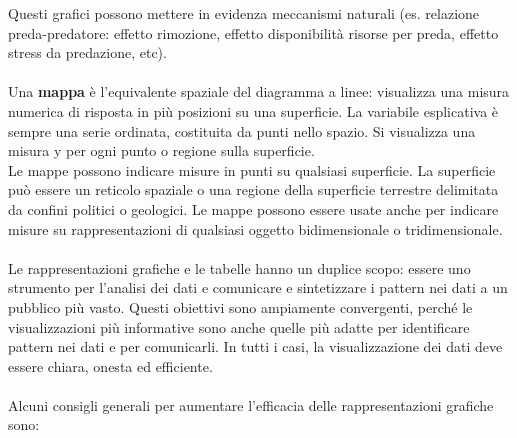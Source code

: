 \documentclass[10pt, draft]{book}
\begin{document}
Questi grafici possono mettere in evidenza meccanismi naturali (es. relazione preda-predatore: effetto rimozione, effetto disponibilità risorse per preda, effetto stress da predazione, etc).
\\
\\
Una \textbf{mappa} è l'equivalente spaziale del diagramma a linee: visualizza una misura numerica di risposta in più posizioni su una superficie. La variabile esplicativa è sempre una serie ordinata, costituita da punti nello spazio. Si visualizza una misura y per ogni punto o regione sulla superficie.
\\
Le mappe possono indicare misure in punti su qualsiasi superficie. La superficie può essere un reticolo spaziale o una regione della superficie terrestre delimitata da confini politici o geologici. Le mappe possono essere usate anche per indicare misure su rappresentazioni di qualsiasi oggetto bidimensionale o tridimensionale.
\\
\\
Le rappresentazioni grafiche e le tabelle hanno un duplice scopo: essere uno strumento per l'analisi dei dati e comunicare e sintetizzare i pattern nei dati a un pubblico più vasto. Questi obiettivi sono ampiamente convergenti, perché le visualizzazioni più informative sono anche quelle più adatte per identificare pattern nei dati e per comunicarli. In tutti i casi, la visualizzazione dei dati deve essere chiara, onesta ed efficiente.
\\
\\
Alcuni consigli generali per aumentare l'efficacia delle rappresentazioni grafiche sono:
\end{document}
